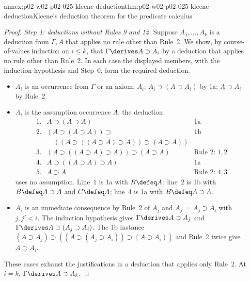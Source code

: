 \begin{annexitem}{annex:p02-w02-p02-025-kleene-deduction}{thm:p02-w02-p02-025-kleene-deduction}{Kleene's deduction theorem for the predicate calculus}
\begin{proof}
\emph{Step 1: deductions without Rules 9 and 12.}  Suppose
\(A_1,\ldots,A_k\) is a deduction from \(\Gamma,A\) that applies no
rule other than Rule~2.  We show, by course-of-values induction on
\(i\leq k\), that \(\Gamma\derives A\supset A_i\) by a deduction that applies
no rule other than Rule~2.  In each case the displayed members, with
the induction hypothesis and Step~0, form the required deduction.
\begin{itemize}
  \item[(a)] \(A_i\) is an occurrence from \(\Gamma\) or an axiom:
        \(A_i\); \(A_i\supset(A\supset A_i)\) by 1a; \(A\supset A_i\) by
        Rule~2.
  \item[(b)] \(A_i\) is the assumption occurrence \(A\): the deduction
        \[
        \begin{array}{lll}
          1. & A\supset(A\supset A) & \text{1a}\\
          2. & (A\supset(A\supset A))\supset{} & \text{1b}\\
             & \quad((A\supset((A\supset A)\supset A))\supset(A\supset A)) & \\
          3. & (A\supset((A\supset A)\supset A))\supset(A\supset A)
             & \text{Rule 2: }1,2\\
          4. & A\supset((A\supset A)\supset A) & \text{1a}\\
          5. & A\supset A & \text{Rule 2: }4,3
        \end{array}
        \]
        uses no assumption.  Line~1 is 1a with \(B\defeq A\); line~2 is 1b
        with \(B\defeq A\supset A\) and \(C\defeq A\); line~4 is 1a with
        \(B\defeq A\supset A\).
  \item[(d)] \(A_i\) is an immediate consequence by Rule~2 of \(A_j\) and
        \(A_{j'}=A_j\supset A_i\) with \(j,j'<i\).  The induction hypothesis gives
        \(\Gamma\derives A\supset A_j\) and
        \(\Gamma\derives A\supset(A_j\supset A_i)\).  The 1b instance
        \((A\supset A_j)\supset((A\supset(A_j\supset A_i))\supset(A\supset A_i))\)
        and Rule~2 twice give \(A\supset A_i\).
\end{itemize}
These cases exhaust the justifications in a deduction that applies only
Rule~2.  At \(i=k\), \(\Gamma\derives A\supset A_k\).


\end{proof}
\end{annexitem}

